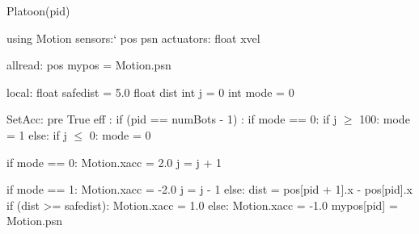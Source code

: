 Platoon(pid)

using Motion 
    sensors:`
       pos psn
    actuators:
       float xvel
       
allread:
   pos mypos = Motion.psn

local:
   float safedist = 5.0
   float dist 
   int j = 0 
   int mode = 0

SetAcc:
  pre True
  eff :
     if (pid == numBots - 1) :
        if mode == 0:
            if j $\geq$ 100:
                 mode = 1
        else:
            if j $\leq$ 0:
                mode = 0
                
        if mode == 0:
            Motion.xacc = 2.0
            j = j + 1
          
        if mode == 1:
            Motion.xacc = -2.0
            j = j - 1
     else:
        dist = pos[pid + 1].x - pos[pid].x
        if (dist >= safedist):
            Motion.xacc = 1.0
        else:
            Motion.xacc = -1.0
    mypos[pid] = Motion.psn

